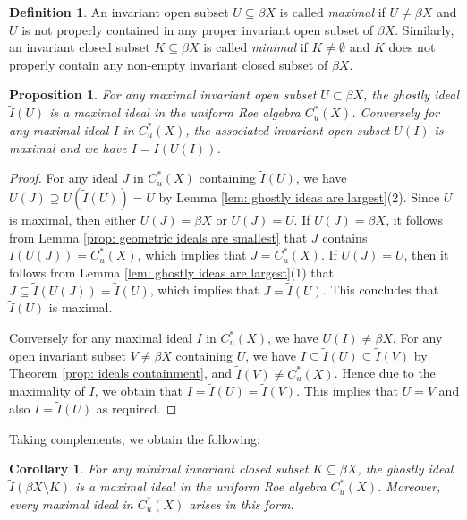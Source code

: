 \documentclass[12pt, a4paper]{amsart}
\numberwithin{equation}{section}
\newtheorem{cor}[thm]{Corollary}
\newtheorem{prop}[thm]{Proposition}
\theoremstyle{definition}
\newtheorem{defn}[thm]{Definition}
\theoremstyle{remark}
\begin{document}
\begin{defn}\label{defn:maximal subset}
An invariant open subset $U \subseteq \beta X$ is called \emph{maximal} if $U \neq \beta X$ and $U$ is not properly contained in any proper invariant open subset of $\beta X$. Similarly, an invariant closed subset $K \subseteq \beta X$ is called \emph{minimal} if $K \neq \emptyset$ and $K$ does not properly contain any non-empty invariant closed subset of $\beta X$.
\end{defn}


\begin{prop}\label{lem:maximal ideals using maximal open subsets}
For any maximal invariant open subset $U \subset \beta X$, the ghostly ideal $\tilde{I}(U)$ is a maximal ideal in the uniform Roe algebra $C^*_u(X)$. Conversely for any maximal ideal $I$ in $C^*_u(X)$, the associated invariant open subset $U(I)$ is maximal and we have $I=\tilde{I}(U(I))$.
\end{prop}

\begin{proof}
For any ideal $J$ in $C^*_u(X)$ containing $\tilde{I}(U)$, we have $U(J) \supseteq U(\tilde{I}(U)) = U$ by Lemma \ref{lem: ghostly ideas are largest}(2). Since $U$ is maximal, then either $U(J) = \beta X$ or $U(J) = U$. If $U(J)= \beta X$, it follows from Lemma \ref{prop: geometric ideals are smallest} that $J$ contains $I(U(J)) = C^*_u(X)$, which implies that $J=C^*_u(X)$. If $U(J) = U$, then it follows from Lemma \ref{lem: ghostly ideas are largest}(1) that $J \subseteq \tilde{I}(U(J)) = \tilde{I}(U)$, which implies that $J=\tilde{I}(U)$. This concludes that $\tilde{I}(U)$ is maximal.

Conversely for any maximal ideal $I$ in $C^*_u(X)$, we have $U(I) \neq \beta X$. For any open invariant subset $V \neq \beta X$ containing $U$, we have $I \subseteq \tilde{I}(U) \subseteq \tilde{I}(V)$ by Theorem \ref{prop: ideals containment}, and $\tilde{I}(V) \neq C^*_u(X)$. Hence due to the maximality of $I$, we obtain that $I = \tilde{I}(U) = \tilde{I}(V)$. This implies that $U=V$ and also $I = \tilde{I}(U)$ as required.
\end{proof}

Taking complements, we obtain the following:

\begin{cor}\label{cor:maximal ideals using minimal closed subsets}
For any minimal invariant closed subset $K \subseteq \beta X$, the ghostly ideal $\tilde{I}(\beta X \setminus K)$ is a maximal ideal in the uniform Roe algebra $C^*_u(X)$. Moreover, every maximal ideal in $C^*_u(X)$ arises in this form.
\end{cor}
\end{document}
